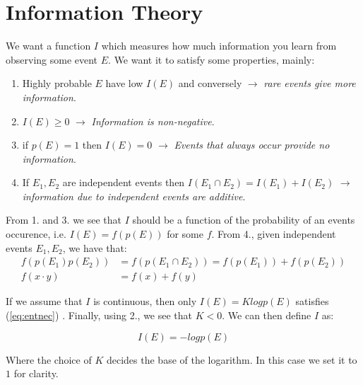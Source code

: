\documentclass[]{article}
\theoremstyle{mattstyle}
\theoremstyle{definition}
\begin{document}
\newpage

\section{Information Theory}

We want a function $I$ which measures how much information you learn from observing some event $E$. We want it to satisfy some properties, mainly:

\begin{enumerate}
	\item Highly probable $E$ have low $I(E)$ and conversely $\rightarrow$ \emph{ rare events give more information}.
	\item $I(E) \ge 0$ $\rightarrow$\emph{ Information is non-negative}.
	\item if $p(E)=1$ then $I(E) = 0$ $\rightarrow$\emph{ Events that always occur provide no information}.
	\item If $E_1, E_2$ are independent events then $I(E_1 \cap E_2) = I(E_1) + I(E_2)$ $\rightarrow$\emph{ information due to independent events are additive}.
\end{enumerate}
From 1. and 3. we see that $I$ should be a function of the probability of an events occurence, i.e. $I(E)=f(p(E))$ for some $f$. From 4., given independent events $E_1, E_2$, we have that:
\begin{align}\label{eq:entnec}
f(p(E_1)p(E_2)) &= f(p(E_1\cap E_2)) = f(p(E_1)) + f(p(E_2))\\
f(x\cdot y) &= f(x) + f(y)
\end{align}

If we assume that $I$ is continuous, then only $I(E) = Klog p(E)$ satisfies (\ref{eq:entnec})  \cite{EntNotes}. Finally, using 2., we see that $K<0$. We can then define $I$ as:

\begin{equation}
I(E) = -log p(E)
\end{equation}

Where the choice of $K$ decides the base of the logarithm. In this case we set it to $1$ for clarity.
\end{document}
